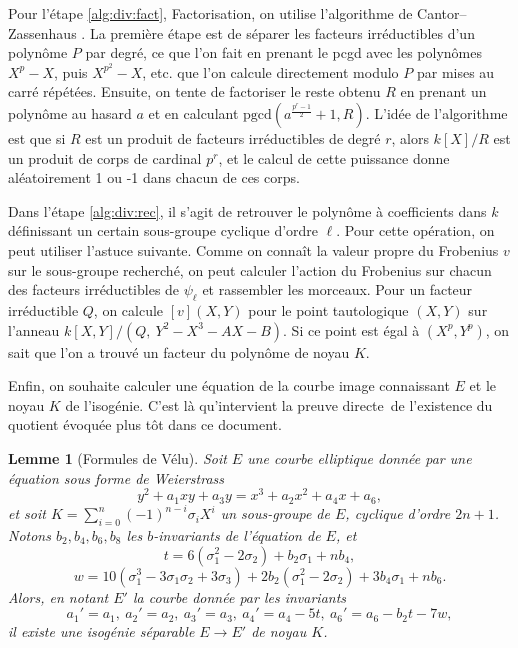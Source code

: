 \documentclass[11pt,a4paper]{article}
\newcommand{\vers}{\longrightarrow}
\renewcommand{\frak}{\mathfrak}
\renewcommand{\mod}{\ \mathrm{mod}\ }
\renewcommand{\v}{\vspace{5mm}}
\newtheorem*{lem}{Lemme}
\theoremstyle{definition}
\begin{document}
Pour l'étape \ref{alg:div:fact}, {\sc Factorisation}, on utilise l'algorithme de Cantor--Zassenhaus \cite{vzGG}. La première étape est de séparer les facteurs irréductibles d'un polynôme $P$ par degré, ce que l'on fait en prenant le pcgd avec les polynômes $X^p - X$, puis $X^{p^2} - X$, etc. que l'on calcule directement modulo $P$ par mises au carré répétées. Ensuite, on tente de factoriser le reste obtenu $R$ en prenant un polynôme au hasard $a$ et en calculant $\mathrm{pgcd}(a^{\frac{p^r - 1}{2}} + 1, R)$. L'idée de l'algorithme est que si $R$ est un produit de facteurs irréductibles de degré $r$, alors $k[X]/R$ est un produit de corps de cardinal $p^r$, et le calcul de cette puissance donne aléatoirement 1 ou -1 dans chacun de ces corps.
\v

Dans l'étape \ref{alg:div:rec}, il s'agit de retrouver le polynôme à coefficients dans $k$ définissant un certain sous-groupe cyclique d'ordre $\ell$. Pour cette opération, on peut utiliser l'astuce suivante. Comme on connaît la valeur propre du Frobenius $v$ sur le sous-groupe recherché, on peut calculer l'action du Frobenius sur chacun des facteurs irréductibles de $\psi_\ell$ et rassembler les morceaux. Pour un facteur irréductible $Q$, on calcule $[v](X, Y)$ pour le point tautologique $(X, Y)$ sur l'anneau $k[X, Y]/(Q,\ Y^2 - X^3 - AX - B).$ Si ce point est égal à $(X^p, Y^p)$, on sait que l'on a trouvé un facteur du polynôme de noyau $K$.
\v
%

Enfin, on souhaite calculer une équation de la courbe image connaissant $E$ et le noyau $K$ de l'isogénie. C'est là qu'intervient la preuve \og directe\fg\ de l'existence du quotient évoquée plus tôt dans ce document.

\begin{lem}[Formules de Vélu]
Soit $E$ une courbe elliptique donnée par une équation sous forme de Weierstrass
$$y^2 + a_1 x y + a_3 y = x^3 + a_2 x^2 + a_4 x + a_6,$$
et soit $K = \sum_{i=0}^n (-1)^{n-i} \sigma_i X^i$ un sous-groupe de $E$,
cyclique d'ordre $2n+1$. Notons $b_2, b_4, b_6, b_8$ les $b$-invariants de l'équation de $E$, et
$$ t = 6(\sigma_1^2 - 2 \sigma_2) + b_2 \sigma_1 + n b_4,$$
$$ w = 10 (\sigma_1^3 - 3 \sigma_1 \sigma_2 + 3 \sigma_3) + 2  b_2 (\sigma_1^2 - 2 \sigma_2) + 3 b_4 \sigma_1 + n b_6.$$
Alors, en notant $E'$ la courbe donnée par les invariants
$$ a_1' = a_1,\ a_2' = a_2,\ a_3' = a_3,\ a_4' = a_4 - 5 t,\ a_6' = a_6 - b_2 t - 7 w,$$
il existe une isogénie séparable $E\vers E'$ de noyau $K$.
\end{lem}
\end{document}
